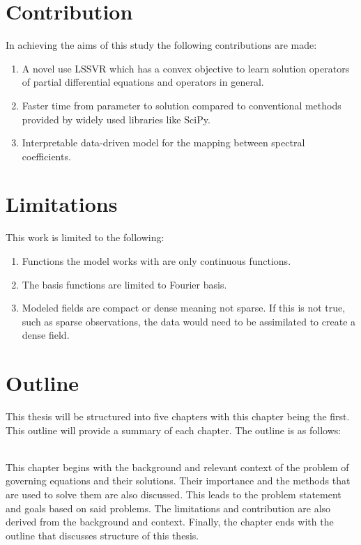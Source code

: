 \section{Contribution}
\noindent In achieving the aims of this study the following contributions are made:
\begin{enumerate}
    \item A novel use LSSVR which has a convex objective to learn solution operators of partial differential equations and operators in general.
    \item Faster time from parameter to solution compared to conventional methods provided by widely used libraries like SciPy.
    \item Interpretable data-driven model for the mapping between spectral coefficients.
\end{enumerate}

\section{Limitations}
\noindent This work is limited to the following:
\begin{enumerate}
    \item Functions the model works with are only continuous functions.
    \item The basis functions are limited to Fourier basis.
    \item Modeled fields are compact or dense meaning not sparse. If this is not true, such as sparse observations, the data would need to be assimilated to create a dense field.
\end{enumerate}

\section{Outline}
\noindent This thesis will be structured into five chapters with this chapter being the first. This outline will provide a summary of each chapter. The outline is as follows:

\noindent{}\\
\noindent This chapter begins with the background and relevant context of the problem of governing equations and their solutions. Their importance and the methods that are used to solve them are also discussed. This leads to the problem statement and goals based on said problems. The limitations and contribution are also derived from the background and context. Finally, the chapter ends with the outline that discusses structure of this thesis.

